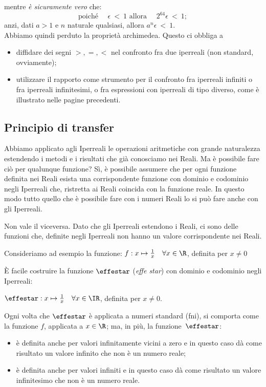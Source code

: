 mentre \emph{è sicuramente vero} che:
\[
 \text{poiché }\quad \epsilon \  < \ 1 
 \text{ allora } \quad 2^{64}\epsilon\ <\ 1;
\]
anzi, dati $a>1$ e $n$ naturale qualsiasi, allora \(a^{n}\epsilon\ <\ 1\).\\

Abbiamo quindi perduto la proprietà archimedea. Questo ci obbliga a 
\begin{itemize} [noitemsep]
 \item 
diffidare dei segni \(>,=,<\) nel confronto fra due iperreali (non standard, 
ovviamente);
 \item 
utilizzare il rapporto come strumento per il confronto fra iperreali infiniti 
o fra iperreali infinitesimi, o fra espressioni con iperreali di tipo 
diverso, come è illustrato nelle pagine precedenti. 
\end{itemize}

\subsection{Principio di transfer}
\label{subsec:insnum_nonarchimedei}

Abbiamo applicato agli Iperreali le operazioni aritmetiche con grande 
naturalezza estendendo i metodi e i risultati che già conosciamo nei Reali. 
Ma è possibile fare ciò per qualunque funzione? 
Sì, è possibile assumere che per ogni funzione definita nei Reali esista una 
corrispondente funzione con dominio e codominio negli Iperreali che, 
ristretta 
ai Reali coincida con la funzione reale.
In questo modo tutto quello che è possibile fare con i numeri Reali lo si può 
fare anche con gli Iperreali.

\begin{osservazione}
 Non vale il viceversa. Dato che gli Iperreali estendono i Reali, ci sono 
delle 
funzioni che, definite negli Iperreali non hanno un valore corrispondente nei 
Reali.

\begin{esempio}
 Consideriamo ad esempio la funzione: 
$f: x \mapsto \frac{1}{x} \quad \forall x \in \R$, definita per $x\ne 0$

È facile costruire la funzione $\effestar$ (\emph{effe star}) con dominio e 
codominio negli Iperreali:

$\effestar: x \mapsto \frac{1}{x} \quad \forall x \in \IR$, definita per 
$x\ne 0$.

Ogni volta che $\effestar$ è applicata a numeri standard (fni), si comporta 
come
la funzione $f$, applicata a $x \in \R$; ma, in più, la funzione~$\effestar$:
\begin{itemize} [noitemsep]
 \item 
è definita anche per valori infinitamente vicini a zero e 
in questo caso dà come risultato un valore infinito che non è un numero reale;
 \item 
è definita anche per valori infiniti e
in questo caso dà come risultato un valore infinitesimo che non è un numero 
reale. 
\end{itemize}
\end{esempio}
\end{osservazione}

